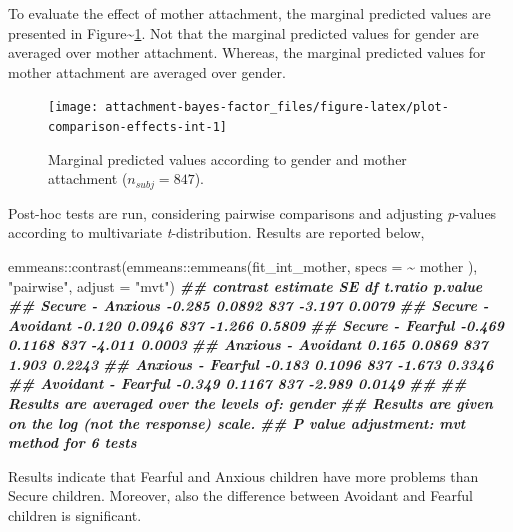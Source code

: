 \documentclass[
]{book}
\newenvironment{Shaded}{\begin{snugshade}}{\end{snugshade}}
\newcommand{\AttributeTok}[1]{\textcolor[rgb]{0.77,0.63,0.00}{#1}}
\newcommand{\DocumentationTok}[1]{\textcolor[rgb]{0.56,0.35,0.01}{\textbf{\textit{#1}}}}
\newcommand{\FunctionTok}[1]{\textcolor[rgb]{0.00,0.00,0.00}{#1}}
\newcommand{\NormalTok}[1]{#1}
\newcommand{\SpecialCharTok}[1]{\textcolor[rgb]{0.00,0.00,0.00}{#1}}
\newcommand{\StringTok}[1]{\textcolor[rgb]{0.31,0.60,0.02}{#1}}
\begin{document}
To evaluate the effect of mother attachment, the marginal predicted values are presented in Figure\textasciitilde\ref{fig:plot-comparison-effects-int}. Not that the marginal predicted values for gender are averaged over mother attachment. Whereas, the marginal predicted values for mother attachment are averaged over gender.

\begin{figure}

{\centering \texttt{[image: attachment-bayes-factor\_files/figure-latex/plot-comparison-effects-int-1]} 

}

\caption{Marginal predicted values according to gender and mother attachment ($n_{subj} = 847$).}\label{fig:plot-comparison-effects-int}
\end{figure}

Post-hoc tests are run, considering pairwise comparisons and adjusting \emph{p}-values according to multivariate \emph{t}-distribution. Results are reported below,

\begin{Shaded}
\begin{Highlighting}[]
\NormalTok{emmeans}\SpecialCharTok{::}\FunctionTok{contrast}\NormalTok{(emmeans}\SpecialCharTok{::}\FunctionTok{emmeans}\NormalTok{(fit\_int\_mother, }\AttributeTok{specs =} \SpecialCharTok{\textasciitilde{}}\NormalTok{ mother ),}
                  \StringTok{"pairwise"}\NormalTok{, }\AttributeTok{adjust =} \StringTok{"mvt"}\NormalTok{)}
\DocumentationTok{\#\#  contrast           estimate     SE  df t.ratio p.value}
\DocumentationTok{\#\#  Secure {-} Anxious     {-}0.285 0.0892 837  {-}3.197  0.0079}
\DocumentationTok{\#\#  Secure {-} Avoidant    {-}0.120 0.0946 837  {-}1.266  0.5809}
\DocumentationTok{\#\#  Secure {-} Fearful     {-}0.469 0.1168 837  {-}4.011  0.0003}
\DocumentationTok{\#\#  Anxious {-} Avoidant    0.165 0.0869 837   1.903  0.2243}
\DocumentationTok{\#\#  Anxious {-} Fearful    {-}0.183 0.1096 837  {-}1.673  0.3346}
\DocumentationTok{\#\#  Avoidant {-} Fearful   {-}0.349 0.1167 837  {-}2.989  0.0149}
\DocumentationTok{\#\# }
\DocumentationTok{\#\# Results are averaged over the levels of: gender }
\DocumentationTok{\#\# Results are given on the log (not the response) scale. }
\DocumentationTok{\#\# P value adjustment: mvt method for 6 tests}
\end{Highlighting}
\end{Shaded}

Results indicate that Fearful and Anxious children have more problems than Secure children. Moreover, also the difference between Avoidant and Fearful children is significant.
\end{document}
